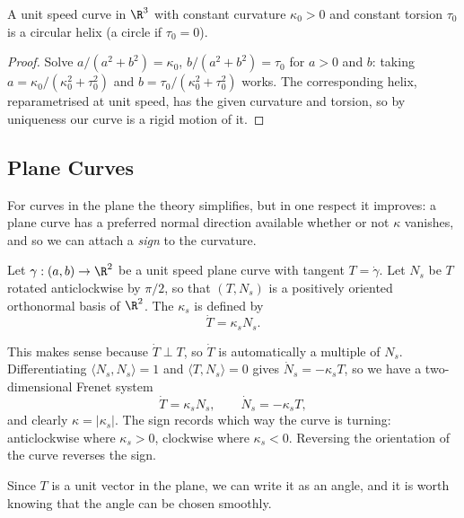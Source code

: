 \begin{corollary}
    A unit speed curve in $\R^3$ with constant curvature $\kappa_0 > 0$ and constant torsion $\tau_0$ is a circular helix (a circle if $\tau_0 = 0$).
\end{corollary}
\begin{proof}
    Solve $a/(a^2+b^2) = \kappa_0$, $b/(a^2+b^2) = \tau_0$ for $a > 0$ and $b$: taking $a = \kappa_0/(\kappa_0^2+\tau_0^2)$ and $b = \tau_0/(\kappa_0^2+\tau_0^2)$ works. The corresponding helix, reparametrised at unit speed, has the given curvature and torsion, so by uniqueness our curve is a rigid motion of it.
\end{proof}

\subsection{Plane Curves}

For curves in the plane the theory simplifies, but in one respect it improves: a plane curve has a preferred normal direction available whether or not $\kappa$ vanishes, and so we can attach a \emph{sign} to the curvature.

\begin{definition}
    Let $\gamma: (a,b) \rightarrow \R^2$ be a unit speed plane curve with tangent $T = \dot\gamma$. Let $N_s$ be $T$ rotated anticlockwise by $\pi/2$, so that $(T, N_s)$ is a positively oriented orthonormal basis of $\R^2$. The  $\kappa_s$ is defined by
    $$
    \dot T = \kappa_s N_s.
    $$
\end{definition}

This makes sense because $\dot T \perp T$, so $\dot T$ is automatically a multiple of $N_s$. Differentiating $\langle N_s, N_s\rangle = 1$ and $\langle T, N_s \rangle = 0$ gives $\dot N_s = -\kappa_s T$, so we have a two-dimensional Frenet system
$$
\dot T = \kappa_s N_s, \qquad \dot N_s = -\kappa_s T,
$$
and clearly $\kappa = |\kappa_s|$. The sign records which way the curve is turning: anticlockwise where $\kappa_s > 0$, clockwise where $\kappa_s < 0$. Reversing the orientation of the curve reverses the sign.

Since $T$ is a unit vector in the plane, we can write it as an angle, and it is worth knowing that the angle can be chosen smoothly.

